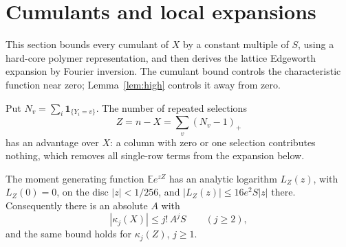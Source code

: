 \documentclass[11pt,a4paper]{article}
\theoremstyle{definition}\newtheorem{remark}[theorem]{Remark}\newtheorem{conjecture}{Conjecture}
\newcommand{\E}{\mathbb E}\newcommand{\Prb}{\mathbb P}\newcommand{\Var}{\operatorname{Var}}
\newcommand{\ind}{\mathbf 1}\newcommand{\eps}{\varepsilon}\newcommand{\dist}{d_{\rm TV}}
\begin{document}
\section{Cumulants and local expansions}\label{sec:polymers}
This section bounds every cumulant of $X$ by a constant multiple of $S$, using a hard-core polymer representation, and then derives the lattice Edgeworth expansion by Fourier inversion. The cumulant bound controls the characteristic function near zero; Lemma~\ref{lem:high} controls it away from zero.

Put $N_v=\sum_i\ind_{\{Y_i=v\}}$. The number of repeated selections
\[
Z=n-X=\sum_v(N_v-1)_+
\]
has an advantage over $X$: a column with zero or one selection contributes nothing, which removes all single-row terms from the expansion below.

\begin{lemma}\label{lem:cumulants}
The moment generating function $\E e^{zZ}$ has an analytic logarithm $L_Z(z)$, with $L_Z(0)=0$, on the disc $|z|<1/256$, and $|L_Z(z)|\le16e^2 S|z|$ there. Consequently there is an absolute $A$ with
\[
|\kappa_j(X)|\le j!\,A^j S\qquad (j\ge2),
\]
and the same bound holds for $\kappa_j(Z)$, $j\ge1$.
\end{lemma}
\end{document}
